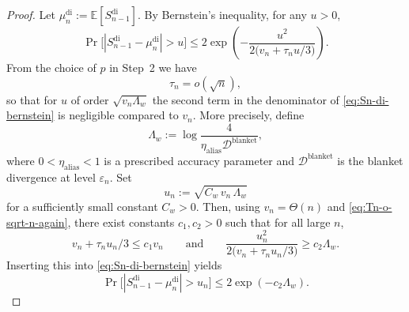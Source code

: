 \documentclass{article}
\theoremstyle{plain}
\theoremstyle{definition}
\begin{document}
\begin{proof}
Let $\mu_n^{\mathrm{di}} := \mathbb E[S_{n-1}^{\mathrm{di}}]$.
By Bernstein's inequality, for any $u>0$,
\begin{equation}
  \label{eq:Sn-di-bernstein}
  \Pr\bigl[|S_{n-1}^{\mathrm{di}} - \mu_n^{\mathrm{di}}| > u\bigr]
  \le
  2\exp\!\left(
    -\frac{u^2}{2\bigl(v_n + \tau_n u/3\bigr)}
  \right).
\end{equation}
From the choice of $p$ in Step~2 we have
\begin{equation}
  \label{eq:Tn-o-sqrt-n-again}
  \tau_n = o(\sqrt{n}),
\end{equation}
so that for $u$ of order $\sqrt{v_n\Lambda_w}$ the second term in the
denominator of \eqref{eq:Sn-di-bernstein} is negligible compared to
$v_n$.
More precisely, define
\[
  \Lambda_w
  :=
  \log\frac{4}{\eta_{\mathrm{alias}}\mathcal{D}^{\mathrm{blanket}}},
\]
where $0<\eta_{\mathrm{alias}}<1$ is a prescribed accuracy parameter
and $\mathcal{D}^{\mathrm{blanket}}$ is the blanket divergence at level
$\varepsilon_n$.
Set
\[
  u_n := \sqrt{C_w\,v_n\,\Lambda_w}
\]
for a sufficiently small constant $C_w>0$.
Then, using $v_n=\Theta(n)$ and \eqref{eq:Tn-o-sqrt-n-again}, there exist
constants $c_1,c_2>0$ such that for all large $n$,
\[
  v_n + \tau_n u_n/3
  \le c_1 v_n
  \qquad\text{and}\qquad
  \frac{u_n^2}{2\bigl(v_n + \tau_n u_n/3\bigr)}
  \ge c_2\Lambda_w.
\]
Inserting this into \eqref{eq:Sn-di-bernstein} yields
\begin{equation}
  \label{eq:Sn-di-tail}
  \Pr\bigl[|S_{n-1}^{\mathrm{di}} - \mu_n^{\mathrm{di}}| > u_n\bigr] %
  \le
  2\exp(-c_2\Lambda_w).
\end{equation}

\medskip


\end{proof}
\end{document}
